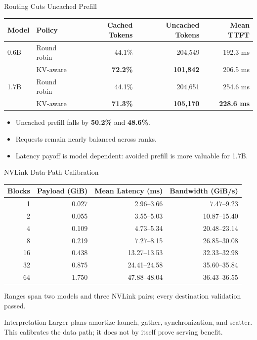 \documentclass[aspectratio=169,10pt]{beamer}
\newcommand{\good}[1]{\textcolor{LMGreen}{\bfseries #1}}
\begin{document}
\begin{frame}{Routing Cuts Uncached Prefill}
  \begin{center}
    \begin{tabular}{@{}llrrr@{}}
      \toprule
      Model & Policy & Cached Tokens & Uncached Tokens & Mean TTFT \\
      \midrule
      0.6B & Round robin & 44.1\% & 204,549 & 192.3 ms \\
           & KV-aware & \good{72.2\%} & \good{101,842} & 206.5 ms \\
      1.7B & Round robin & 44.1\% & 204,651 & 254.6 ms \\
           & KV-aware & \good{71.3\%} & \good{105,170} & \good{228.6 ms} \\
      \bottomrule
    \end{tabular}
  \end{center}
  \vspace{0.8em}
  \begin{itemize}
    \item Uncached prefill falls by \good{50.2\%} and \good{48.6\%}.
    \item Requests remain nearly balanced across ranks.
    \item Latency payoff is model dependent: avoided prefill is more valuable for 1.7B.
  \end{itemize}
\end{frame}

\begin{frame}{NVLink Data-Path Calibration}
  \scriptsize
  \begin{center}
    \begin{tabular}{@{}rrrr@{}}
      \toprule
      Blocks & Payload (GiB) & Mean Latency (ms) & Bandwidth (GiB/s) \\
      \midrule
       1 & 0.027 &  2.96--3.66 &  7.47--9.23 \\
       2 & 0.055 &  3.55--5.03 & 10.87--15.40 \\
       4 & 0.109 &  4.73--5.34 & 20.48--23.14 \\
       8 & 0.219 &  7.27--8.15 & 26.85--30.08 \\
      16 & 0.438 & 13.27--13.53 & 32.33--32.98 \\
      32 & 0.875 & 24.41--24.58 & 35.60--35.84 \\
      64 & 1.750 & 47.88--48.04 & 36.43--36.55 \\
      \bottomrule
    \end{tabular}
  \end{center}
  \vspace{0.35em}
  \begin{center}
    \small Ranges span two models and three NVLink pairs; every destination validation passed.
  \end{center}
  \vspace{0.25em}
  \begin{alertblock}{Interpretation}
    Larger plans amortize launch, gather, synchronization, and scatter. This calibrates the data path; it does not by itself prove serving benefit.
  \end{alertblock}
\end{frame}
\end{document}
